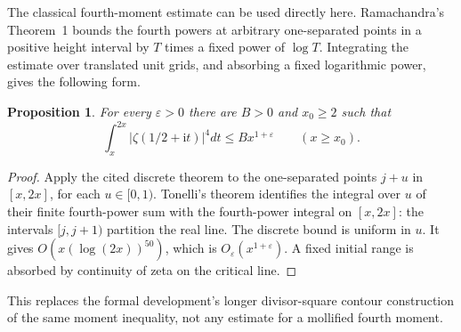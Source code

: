 \documentclass[11pt,a4paper,oneside]{article}
\newtheorem{proposition}[theorem]{Proposition}
\theoremstyle{definition}
\newcommand{\eps}{\varepsilon}
\newcommand{\ii}{\mathrm i}
\numberwithin{equation}{section}
\begin{document}
The classical fourth-moment estimate can be used directly here. Ramachandra's Theorem~1 \cite{Ramachandra} bounds the fourth powers at arbitrary one-separated points in a positive height interval by $T$ times a fixed power of $\log T$. Integrating the estimate over translated unit grids, and absorbing a fixed logarithmic power, gives the following form.
\begin{proposition}\label{input:fourthzeta}
For every $\eps>0$ there are $B>0$ and $x_0\ge2$ such that
\[
 \int_x^{2x}|\zeta(1/2+\ii t)|^4dt\le Bx^{1+\eps}
 \qquad(x\ge x_0).
\]
\end{proposition}
\begin{proof}
Apply the cited discrete theorem to the one-separated points $j+u$ in $[x,2x]$, for each $u\in[0,1)$. Tonelli's theorem identifies the integral over $u$ of their finite fourth-power sum with the fourth-power integral on $[x,2x]$: the intervals $[j,j+1)$ partition the real line. The discrete bound is uniform in $u$. It gives $O(x(\log(2x))^{50})$, which is $O_\eps(x^{1+\eps})$. A fixed initial range is absorbed by continuity of zeta on the critical line.
\end{proof}
This replaces the formal development's longer divisor-square contour construction of the same moment inequality, not any estimate for a mollified fourth moment.
\end{document}
